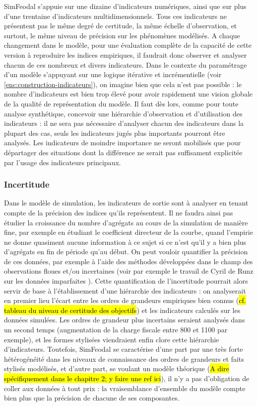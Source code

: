 SimFeodal s'appuie sur une dizaine d'indicateurs numériques, ainsi que sur plus d'une trentaine d'indicateurs multidimensionnels.
Tous ces indicateurs ne présentent pas le même degré de certitude, la même échelle d'observation, et surtout, le même niveau de précision sur les phénomènes modélisés.
A chaque changement dans le modèle, pour une évaluation complète de la capacité de cette version à reproduire les indices empiriques, il faudrait donc observer et analyser chacun de ces nombreux et divers indicateurs.
Dans le contexte du paramétrage d'un modèle s'appuyant sur une logique itérative et incrémentielle (voir \cref{enc:construction-indicateurs}), on imagine bien que cela n'est pas possible :
le nombre d'indicateurs est bien trop élevé pour avoir rapidement une vision globale de la qualité de représentation du modèle.
Il faut dès lors, comme pour toute analyse synthétique, concevoir une hiérarchie d'observation et d'utilisation des indicateurs :
il ne sera pas nécessaire d'analyser chacun des indicateurs dans la plupart des cas, seuls les indicateurs jugés plus importants pourront être analysés.
Les indicateurs de moindre importance ne seront mobilisés que pour départager des situations dont la différence ne serait pas suffisament explicitée par l'usage des indicateurs principaux.

\subsubsection{Incertitude}\label{sssec:incertitude}
Dans le modèle de simulation, les indicateurs de sortie sont à analyser en tenant compte de la précision des indices qu'ils représentent.
Il ne faudra ainsi pas étudier la croissance  du nombre d'agrégats au cours de la simulation de manière fine, par exemple en étudiant le coefficient directeur de la courbe, quand l'empirie ne donne quasiment aucune information à ce sujet si ce n'est qu'il y a bien plus d'agrégats en fin de période qu'au début.
On peut vouloir quantifier la précision de ces données, par exemple à l'aide des méthodes développées dans le champ des observations floues et/ou incertaines (voir par exemple le travail de Cyril de Runz sur les données \og imparfaites\fg{} \autocite{de2008imperfection}).
Cette quantification de l'incertitude pourrait alors servir de base à l'établissement d'une hiérarchie des indicateurs :
on analyserait en premier lieu l'écart entre les ordres de grandeurs empiriques bien connus (\hl{cf. tableau du niveau de certitude des objectifs}) et les indicateurs calculés sur les données simulées.
Les ordres de grandeur plus incertains seraient analysés dans un second temps (augmentation de la charge fiscale entre 800 et 1100 par exemple), et les formes stylisées viendraient enfin clore cette hiérarchie d'indicateurs.
Toutefois, SimFeodal se caractérise d'une part par une très forte hétérogénéité dans les niveaux de connaissance des ordres de grandeurs et faits stylisés modélisés, et d'autre part, se voulant un modèle théorique (\hl{A dire spécifiquement dans le chapitre 2; y faire une ref ici}), il n'y a pas d'obligation de \og coller aux données\fg{} à tout prix :
la vraisemblance d'ensemble du modèle compte bien plus que la précision de chacune de ses composantes.


